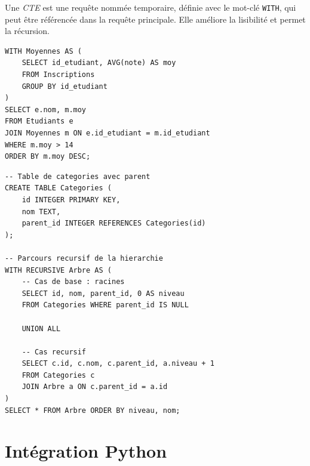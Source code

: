 \begin{definition}
Une \emph{CTE} est une requ\^ete nomm\'ee temporaire, d\'efinie avec le mot-cl\'e
\texttt{WITH}, qui peut \^etre r\'ef\'erenc\'ee dans la requ\^ete principale.
Elle am\'eliore la lisibilit\'e et permet la r\'ecursion.
\end{definition}

\begin{codeblock}[title=\textbf{CTE simple}]
\begin{verbatim}
WITH Moyennes AS (
    SELECT id_etudiant, AVG(note) AS moy
    FROM Inscriptions
    GROUP BY id_etudiant
)
SELECT e.nom, m.moy
FROM Etudiants e
JOIN Moyennes m ON e.id_etudiant = m.id_etudiant
WHERE m.moy > 14
ORDER BY m.moy DESC;
\end{verbatim}
\end{codeblock}

\begin{codeblock}[title=\textbf{CTE r\'ecursive --- hi\'erarchie}]
\begin{verbatim}
-- Table de categories avec parent
CREATE TABLE Categories (
    id INTEGER PRIMARY KEY,
    nom TEXT,
    parent_id INTEGER REFERENCES Categories(id)
);

-- Parcours recursif de la hierarchie
WITH RECURSIVE Arbre AS (
    -- Cas de base : racines
    SELECT id, nom, parent_id, 0 AS niveau
    FROM Categories WHERE parent_id IS NULL

    UNION ALL

    -- Cas recursif
    SELECT c.id, c.nom, c.parent_id, a.niveau + 1
    FROM Categories c
    JOIN Arbre a ON c.parent_id = a.id
)
SELECT * FROM Arbre ORDER BY niveau, nom;
\end{verbatim}
\end{codeblock}

\section{Int\'egration Python}

